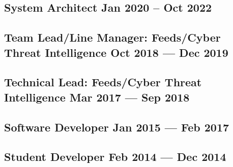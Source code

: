 \subsection{{System Architect \hfill Jan 2020 -- Oct 2022}}
\subsection{{Team Lead/Line Manager: Feeds/Cyber Threat Intelligence \hfill Oct 2018 --- Dec 2019}}
\subsection{{Technical Lead: Feeds/Cyber Threat Intelligence \hfill Mar 2017 --- Sep 2018}}
\subsection{{Software Developer \hfill Jan 2015 --- Feb 2017}}
\subsection{{Student Developer \hfill Feb 2014 --- Dec 2014}}


